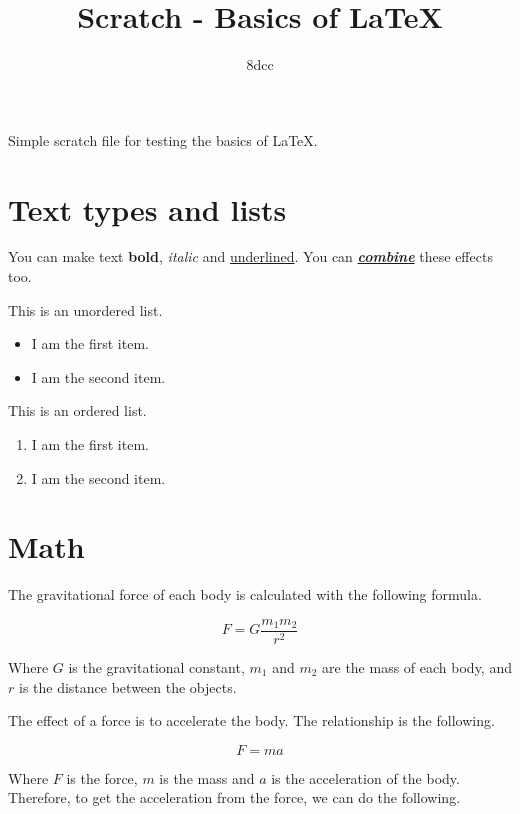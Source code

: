 \documentclass{article}
\title{Scratch - Basics of \LaTeX}
\author{8dcc}
\date{}
\begin{document}
\maketitle

Simple scratch file for testing the basics of \LaTeX.

\section{Text types and lists}

You can make text \textbf{bold}, \textit{italic} and \underline{underlined}.
You can \underline{\textbf{\textit{combine}}} these effects too.

This is an unordered list.

\begin{itemize}
  \item I am the first item.
  \item I am the second item.
\end{itemize}

This is an ordered list.

\begin{enumerate}
  \item I am the first item.
  \item I am the second item.
\end{enumerate}

\section{Math}

The gravitational force of each body is calculated with the following formula.

\begin{displaymath}
    F = G \frac{m_1m_2}{r^2}
\end{displaymath}

Where \(G\) is the gravitational constant, \(m_1\) and \(m_2\) are the mass of
each body, and \(r\) is the distance between the objects.

The effect of a force is to accelerate the body. The relationship is the
following.

\begin{displaymath}
   F = m a
\end{displaymath}

Where \(F\) is the force, \(m\) is the mass and \(a\) is the acceleration of
the body. Therefore, to get the acceleration from the force, we can do the
following.
\end{document}
